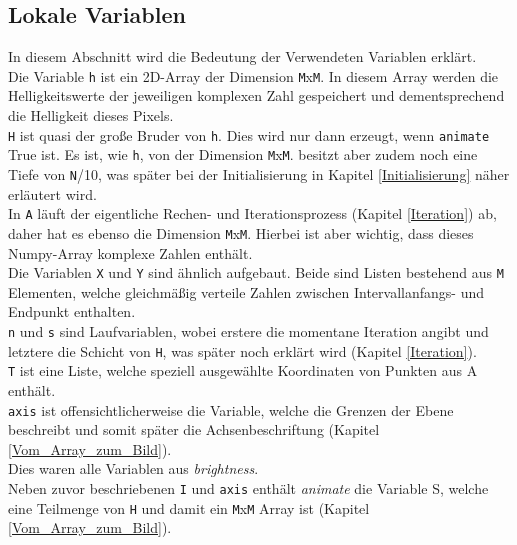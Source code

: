 \documentclass[12pt]{scrartcl}
\begin{document}
\subsection{Lokale Variablen}
In diesem Abschnitt wird die Bedeutung der Verwendeten Variablen erklärt.\\

Die Variable \texttt{h} ist ein 2D-Array der Dimension \texttt{M}x\texttt{M}. In diesem Array werden die Helligkeitswerte der jeweiligen komplexen Zahl gespeichert und dementsprechend die Helligkeit dieses Pixels.\\

\texttt{H} ist quasi der große Bruder von \texttt{h}. Dies wird nur dann erzeugt, wenn \texttt{animate} True ist. Es ist, wie \texttt{h}, von der Dimension \texttt{M}x\texttt{M}. besitzt aber zudem noch eine Tiefe von \texttt{N}/10, was später bei der Initialisierung in Kapitel \ref{Initialisierung} näher erläutert wird.\\

In \texttt{A} läuft der eigentliche Rechen- und Iterationsprozess (Kapitel \ref{Iteration}) ab, daher hat es ebenso die Dimension \texttt{M}x\texttt{M}. Hierbei ist aber wichtig, dass dieses Numpy-Array komplexe Zahlen enthält.\\

Die Variablen \texttt{X} und \texttt{Y} sind ähnlich aufgebaut. Beide sind Listen bestehend aus \texttt{M} Elementen, welche gleichmäßig verteile Zahlen zwischen Intervallanfangs- und Endpunkt enthalten.\\

\texttt{n} und \texttt{s} sind Laufvariablen, wobei erstere die momentane Iteration angibt und letztere die Schicht von \texttt{H}, was später noch erklärt wird (Kapitel \ref{Iteration}).\\

\texttt{T} ist eine Liste, welche speziell ausgewählte Koordinaten von Punkten aus A enthält.\\

\texttt{axis} ist offensichtlicherweise die Variable, welche die Grenzen der Ebene beschreibt und somit später die Achsenbeschriftung (Kapitel \ref{Vom_Array_zum_Bild}).\\

Dies waren alle Variablen aus \textit{brightness}.\\

Neben zuvor beschriebenen \texttt{I} und \texttt{axis} enthält \textit{animate} die Variable S, welche eine Teilmenge von \texttt{H} und damit ein \texttt{M}x\texttt{M} Array ist (Kapitel \ref{Vom_Array_zum_Bild}).
\end{document}
